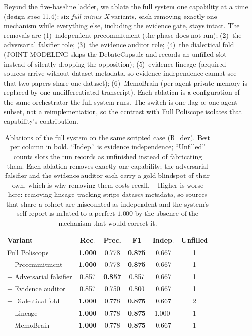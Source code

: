 Beyond the five-baseline ladder, we ablate the full system one capability at
a time (design spec 11.4): six \emph{full minus X} variants, each removing
exactly one mechanism while everything else, including the evidence gate,
stays intact. The removals are (1)~independent precommitment (the phase does
not run); (2)~the adversarial falsifier role; (3)~the evidence auditor role;
(4)~the dialectical fold (JOINT MODELING skips the DebateCapsule and records
an unfilled slot instead of silently dropping the opposition); (5)~evidence
lineage (acquired sources arrive without dataset metadata, so evidence
independence cannot see that two papers share one dataset); (6)~MemoBrain
(per-agent private memory is replaced by one undifferentiated transcript).
Each ablation is a configuration of the same orchestrator the full system
runs. The switch is one flag or one agent subset, not a reimplementation, so
the contrast with Full Poliscope isolates that capability's contribution.

\begin{table}[t]
\centering
\small
\begin{tabular}{@{}lccccc@{}}
\toprule
\textbf{Variant} & \textbf{Rec.} & \textbf{Prec.} & \textbf{F1} & \textbf{Indep.} & \textbf{Unfilled} \\
\midrule
Full Poliscope & \textbf{1.000} & 0.778 & \textbf{0.875} & 0.667 & 1 \\
\quad$-$ Precommitment & \textbf{1.000} & 0.778 & \textbf{0.875} & 0.667 & 1 \\
\quad$-$ Adversarial falsifier & 0.857 & \textbf{0.857} & 0.857 & 0.667 & 1 \\
\quad$-$ Evidence auditor & 0.857 & 0.750 & 0.800 & 0.667 & 1 \\
\quad$-$ Dialectical fold & \textbf{1.000} & 0.778 & \textbf{0.875} & 0.667 & 2 \\
\quad$-$ Lineage & \textbf{1.000} & 0.778 & \textbf{0.875} & 1.000$^\dagger$ & 1 \\
\quad$-$ MemoBrain & \textbf{1.000} & 0.778 & \textbf{0.875} & 0.667 & 1 \\
\bottomrule
\end{tabular}
\caption{Ablations of the full system on the same scripted case (B\_dev).
Best per column in bold. ``Indep.'' is evidence independence; ``Unfilled''
counts slots the run records as unfinished instead of fabricating them. Each
ablation removes exactly one capability; the adversarial falsifier and the
evidence auditor each carry a gold blindspot of their own, which is why
removing them costs recall. $^\dagger$~Higher is worse here: removing
lineage tracking strips dataset metadata, so sources that share a cohort are
miscounted as independent and the system's self-report is inflated to a
perfect $1.000$ by the absence of the mechanism that would correct it.}
\label{tab:ablations}
\end{table}

